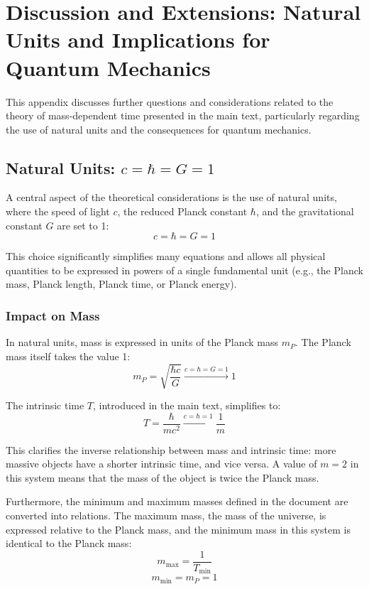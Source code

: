 \documentclass{article}
\begin{document}
\appendix
\section{Discussion and Extensions: Natural Units and Implications for Quantum Mechanics}

This appendix discusses further questions and considerations related to the theory of mass-dependent time presented in the main text, particularly regarding the use of natural units and the consequences for quantum mechanics.

\subsection{Natural Units: \(c = \hbar = G = 1\)}

A central aspect of the theoretical considerations is the use of natural units, where the speed of light \(c\), the reduced Planck constant \(\hbar\), and the gravitational constant \(G\) are set to 1:
\[
c = \hbar = G = 1
\]

This choice significantly simplifies many equations and allows all physical quantities to be expressed in powers of a single fundamental unit (e.g., the Planck mass, Planck length, Planck time, or Planck energy).

\subsubsection{Impact on Mass}

In natural units, mass is expressed in units of the Planck mass \(m_P\). The Planck mass itself takes the value 1:
\[
m_P = \sqrt{\frac{\hbar c}{G}} \xrightarrow{c=\hbar=G=1} 1
\]

The intrinsic time \(T\), introduced in the main text, simplifies to:
\[
T = \frac{\hbar}{mc^2} \xrightarrow{c=\hbar=1} \frac{1}{m}
\]

This clarifies the inverse relationship between mass and intrinsic time: more massive objects have a shorter intrinsic time, and vice versa. A value of \(m = 2\) in this system means that the mass of the object is twice the Planck mass.

Furthermore, the minimum and maximum masses defined in the document are converted into relations. The maximum mass, the mass of the universe, is expressed relative to the Planck mass, and the minimum mass in this system is identical to the Planck mass:
\[
m_{\text{max}} = \frac{1}{T_{\text{min}}}
\]
\[
m_{\text{min}} = m_P = 1
\]
\end{document}
